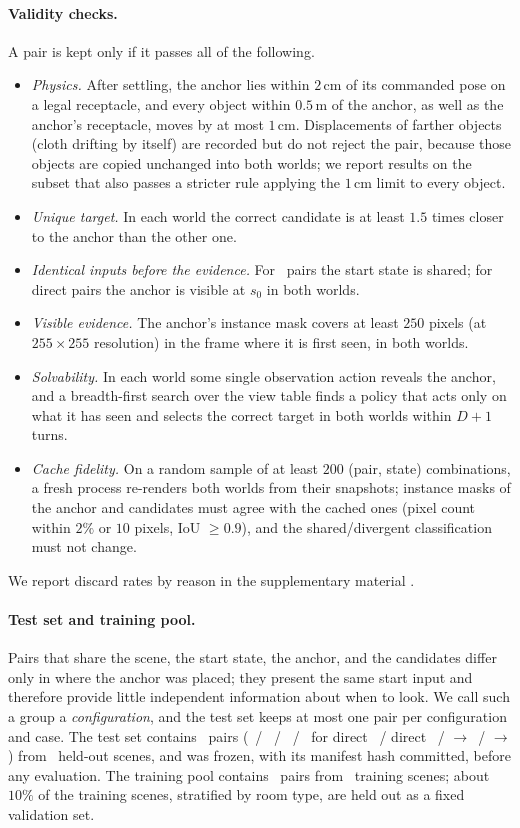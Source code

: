 \paragraph{Validity checks.}
A pair is kept only if it passes all of the following.
\begin{itemize}
\item \emph{Physics.} After settling, the anchor lies within $2$\,cm of its commanded pose on a legal receptacle, and every object within $0.5$\,m of the anchor, as well as the anchor's receptacle, moves by at most $1$\,cm. Displacements of farther objects (\eg cloth drifting by itself) are recorded but do not reject the pair, because those objects are copied unchanged into both worlds; we report results on the subset that also passes a stricter rule applying the $1$\,cm limit to every object.
\item \emph{Unique target.} In each world the correct candidate is at least $1.5$ times closer to the anchor than the other one.
\item \emph{Identical inputs before the evidence.} For \Look\ pairs the start state is shared; for direct pairs the anchor is visible at $s_0$ in both worlds.
\item \emph{Visible evidence.} The anchor's instance mask covers at least $250$ pixels (at $255{\times}255$ resolution) in the frame where it is first seen, in both worlds.
\item \emph{Solvability.} In each world some single observation action reveals the anchor, and a breadth-first search over the view table finds a policy that acts only on what it has seen and selects the correct target in both worlds within $D{+}1$ turns.
\item \emph{Cache fidelity.} On a random sample of at least $200$ (pair, state) combinations, a fresh process re-renders both worlds from their snapshots; instance masks of the anchor and candidates must agree with the cached ones (pixel count within $2\%$ or $10$ pixels, IoU $\ge 0.9$), and the shared/divergent classification must not change.
\end{itemize}
We report discard rates by reason in the supplementary material .

\paragraph{Test set and training pool.}
Pairs that share the scene, the start state, the anchor, and the candidates differ only in where the anchor was placed; they present the same start input and therefore provide little independent information about when to look.
We call such a group a \emph{configuration}, and the test set keeps at most one pair per configuration and case.
The test set contains \tbd\ pairs (\tbd\ / \tbd\ / \tbd\ / \tbd\ for direct \Flip\ / direct \Stay\ / \Look$\to$\Flip\ / \Look$\to$\Stay) from \tbd\ held-out scenes, and was frozen, with its manifest hash committed, before any evaluation.
The training pool contains \tbd\ pairs from \tbd\ training scenes; about $10\%$ of the training scenes, stratified by room type, are held out as a fixed validation set.

